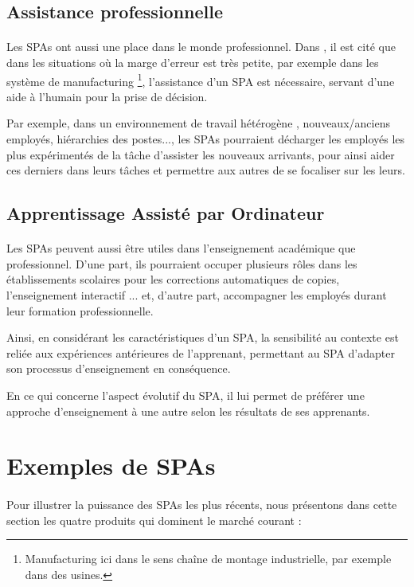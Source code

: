 \subsection{Assistance professionnelle}
\paragraph{}
Les SPAs ont aussi une place dans le monde professionnel. Dans \citep{Imtiaz2014}, il est cité que dans les situations où la marge d'erreur est très petite, par exemple dans les système de manufacturing \footnote{Manufacturing ici dans le sens chaîne de montage industrielle, par exemple dans des usines.}, l'assistance d'un SPA est nécessaire, servant d'une aide à l'humain pour la prise de décision.
\par
Par exemple, dans un environnement de travail hétérogène , nouveaux/anciens employés, hiérarchies des postes..., les SPAs pourraient décharger les employés les plus expérimentés de la tâche d'assister les nouveaux arrivants, pour ainsi aider ces derniers dans leurs tâches et permettre aux autres de se focaliser sur les leurs.

\subsection{Apprentissage Assisté par Ordinateur}
\paragraph{}
Les SPAs peuvent aussi être utiles dans l'enseignement académique que professionnel. D'une part, ils pourraient occuper plusieurs rôles dans les établissements scolaires pour les corrections automatiques de copies, l'enseignement interactif ... \citep{ENGAGINGTA} et, d'autre part, accompagner les employés durant leur formation professionnelle.
\par
Ainsi, en considérant les caractéristiques d'un SPA, la sensibilité au contexte est reliée aux expériences antérieures de l'apprenant, permettant au SPA d'adapter son processus d'enseignement en conséquence.
\par 
En ce qui concerne l'aspect évolutif du SPA, il lui permet de préférer une approche d'enseignement à une autre selon les résultats de ses apprenants.

\section{Exemples de SPAs}
\paragraph{}
Pour illustrer la puissance des SPAs les plus récents, nous présentons dans cette section les quatre produits qui dominent le marché courant :

